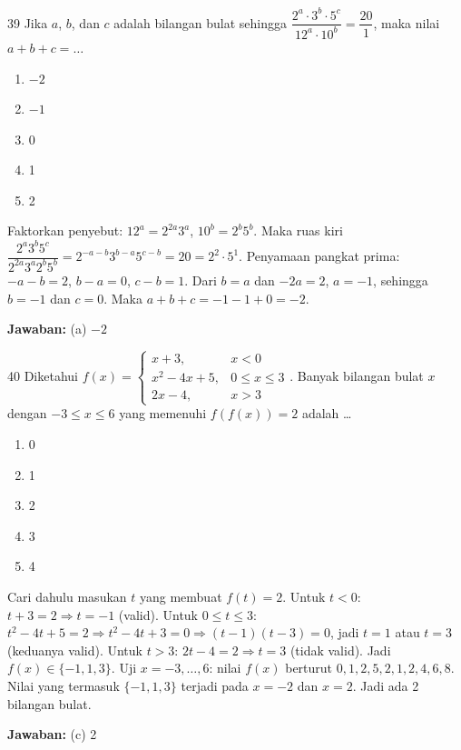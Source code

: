 \documentclass[11pt]{article}
\newenvironment{pil}{\begin{enumerate}[label=(\alph*),leftmargin=*,itemsep=1pt,topsep=3pt]}{\end{enumerate}}
\newcommand{\jw}[1]{\par\smallskip\noindent\textbf{Jawaban:} #1}
\begin{document}
\begin{soalbox}{39}
Jika $a$, $b$, dan $c$ adalah bilangan bulat sehingga $\dfrac{2^a\cdot3^b\cdot5^c}{12^a\cdot10^b}=\dfrac{20}{1}$, maka nilai $a+b+c=\ldots$
\begin{pil}\item $-2$ \item $-1$ \item 0 \item 1 \item 2\end{pil}
\end{soalbox}
\begin{pembox}
Faktorkan penyebut: $12^a=2^{2a}3^a$, $10^b=2^b5^b$. Maka ruas kiri $\dfrac{2^a3^b5^c}{2^{2a}3^a2^b5^b}=2^{-a-b}3^{b-a}5^{c-b}=20=2^2\cdot5^1$. Penyamaan pangkat prima: $-a-b=2$, $b-a=0$, $c-b=1$. Dari $b=a$ dan $-2a=2$, $a=-1$, sehingga $b=-1$ dan $c=0$. Maka $a+b+c=-1-1+0=-2$.
\jw{(a) $-2$}
\end{pembox}

\begin{soalbox}{40}
Diketahui $f(x)=\begin{cases}x+3, & x<0\\ x^2-4x+5, & 0\leq x\leq3\\ 2x-4, & x>3\end{cases}$. Banyak bilangan bulat $x$ dengan $-3\leq x\leq6$ yang memenuhi $f(f(x))=2$ adalah \ldots
\begin{pil}\item 0 \item 1 \item 2 \item 3 \item 4\end{pil}
\end{soalbox}
\begin{pembox}
Cari dahulu masukan $t$ yang membuat $f(t)=2$. Untuk $t<0$: $t+3=2\Rightarrow t=-1$ (valid). Untuk $0\leq t\leq3$: $t^2-4t+5=2\Rightarrow t^2-4t+3=0\Rightarrow(t-1)(t-3)=0$, jadi $t=1$ atau $t=3$ (keduanya valid). Untuk $t>3$: $2t-4=2\Rightarrow t=3$ (tidak valid). Jadi $f(x)\in\{-1,1,3\}$. Uji $x=-3,\ldots,6$: nilai $f(x)$ berturut $0,1,2,5,2,1,2,4,6,8$. Nilai yang termasuk $\{-1,1,3\}$ terjadi pada $x=-2$ dan $x=2$. Jadi ada 2 bilangan bulat.
\jw{(c) 2}
\end{pembox}
\end{document}
